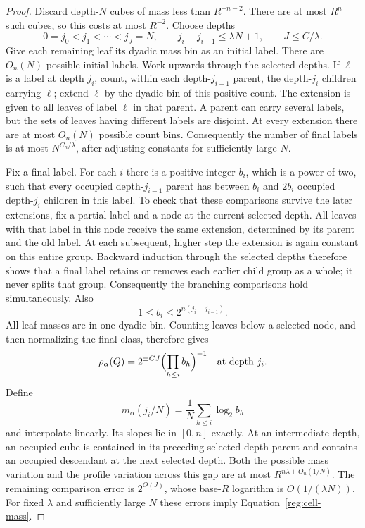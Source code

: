\begin{proof}
Discard depth-$N$ cubes of mass less than $R^{-n-2}$.  There are at most
$R^n$ such cubes, so this costs at most $R^{-2}$.  Choose depths
\[
0=j_0<j_1<\cdots<j_J=N,
\qquad j_i-j_{i-1}\le\lambda N+1,
\qquad J\le C/\lambda.
\]
Give each remaining leaf its dyadic mass bin as an initial label.  There
are $O_n(N)$ possible initial labels.  Work upwards through the selected
depths.  If $\ell$ is a label at depth $j_i$, count, within each
depth-$j_{i-1}$ parent, the depth-$j_i$ children carrying $\ell$; extend
$\ell$ by the dyadic bin of this positive count.  The extension is given
to all leaves of label $\ell$ in that parent.  A parent can carry
several labels, but the sets of leaves having different labels are
disjoint.  At every extension there are at most $O_n(N)$ possible count
bins.  Consequently the number of final labels is at most
$N^{C_n/\lambda}$, after adjusting constants for sufficiently large $N$.

Fix a final label.  For each $i$ there is a positive integer $b_i$,
which is a power of two, such that every occupied depth-$j_{i-1}$ parent
has between $b_i$ and $2b_i$ occupied depth-$j_i$ children in this label.
To check that these comparisons survive the later extensions, fix a
partial label and a node at the current selected depth. All leaves with
that label in this node receive the same extension, determined by its
parent and the old label. At each subsequent, higher step the extension
is again constant on this entire group. Backward induction through the
selected depths therefore shows that a final label retains or removes
each earlier child group as a whole; it never splits that group.
Consequently the branching comparisons hold simultaneously. Also
\[
1\le b_i\le 2^{n(j_i-j_{i-1})}.
\]
All leaf masses are in one dyadic bin.  Counting leaves below a selected
node, and then normalizing the final class, therefore gives
\[
\rho_\alpha(Q)=2^{\pm C J}
                  \Bigl(\prod_{h\le i}b_h\Bigr)^{-1}
\quad\text{at depth }j_i.
\]
Define
\[
m_\alpha(j_i/N)=\frac1N\sum_{h\le i}\log_2b_h
\]
and interpolate linearly.  Its slopes lie in $[0,n]$ exactly.  At an
intermediate depth, an occupied cube is contained in its preceding
selected-depth parent and contains an occupied descendant at the next
selected depth.  Both the possible mass variation and the profile
variation across this gap are at most $R^{n\lambda+O_n(1/N)}$.
The remaining comparison error is $2^{O(J)}$, whose base-$R$
logarithm is $O(1/(\lambda N))$.  For fixed $\lambda$ and sufficiently
large $N$ these errors imply Equation~\eqref{reg:cell-mass}.


\end{proof}
